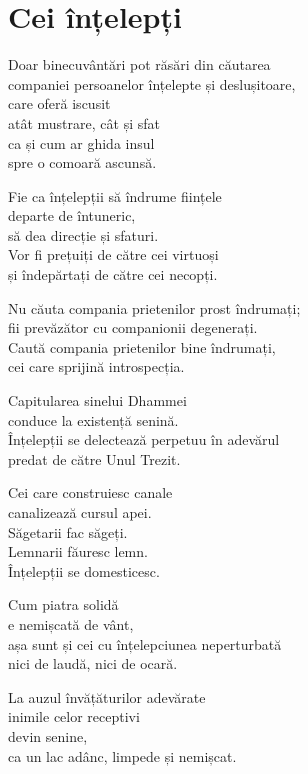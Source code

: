 
\chapter{Cei înțelepți}


Doar binecuvântări pot răsări din căutarea\\
companiei persoanelor înțelepte și deslușitoare,\\
care oferă iscusit\\
atât mustrare, cât și sfat\\
ca și cum ar ghida insul\\
spre o comoară ascunsă.


Fie ca înțelepții să îndrume ființele\\
departe de întuneric,\\
să dea direcție și sfaturi.\\
Vor fi prețuiți de către cei virtuoși\\
și îndepărtați de către cei necopți.


Nu căuta compania prietenilor prost îndrumați;\\
fii prevăzător cu companionii degenerați.\\
Caută compania prietenilor bine îndrumați,\\
cei care sprijină introspecția.


Capitularea sinelui Dhammei\\
conduce la existență senină.\\
Înțelepții se delectează perpetuu în adevărul\\
predat de către Unul Trezit.


Cei care construiesc canale\\
canalizează cursul apei.\\
Săgetarii fac săgeți.\\
Lemnarii făuresc lemn.\\
Înțelepții se domesticesc.


Cum piatra solidă\\
e nemișcată de vânt,\\
așa sunt și cei cu înțelepciunea neperturbată\\
nici de laudă, nici de ocară.


La auzul învățăturilor adevărate\\
inimile celor receptivi\\
devin senine,\\
ca un lac adânc, limpede și nemișcat.


